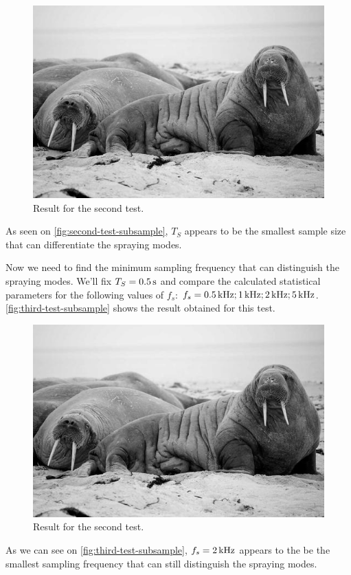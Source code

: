 \documentclass[oneside,12pt]{article}
\begin{document}
\begin{figure}[h!]
    \centering
    \includegraphics[width=.8\textwidth,trim=1 1 1 1,clip]{figures/lorem-picsum.jpg}
    \caption{Result for the second test.}
    \label{fig:second-test-subsample}
\end{figure}

As seen on \autoref{fig:second-test-subsample},  $T_S$ appears to be the smallest sample size that can differentiate the spraying modes.

Now we need to find the minimum sampling frequency that can distinguish the spraying modes. We'll fix $T_S = 0.5 \,\mathrm{s}$ and compare the calculated 
statistical parameters for the following values of $f_s$: $f_s = 0.5 \,\mathrm{kHz}; 1 \,\mathrm{kHz}; 2 \,\mathrm{kHz}; 5 \,\mathrm{kHz}$. \autoref{fig:third-test-subsample}
shows the result obtained for this test.

\begin{figure}[h!]
    \centering
    \includegraphics[width=.8\textwidth,trim=1 1 1 1,clip]{figures/lorem-picsum.jpg}
    \caption{Result for the second test.}
    \label{fig:third-test-subsample}
\end{figure}

As we can see on \autoref{fig:third-test-subsample}, $f_s = 2 \,\mathrm{kHz}$ appears to the be the smallest sampling frequency that can still distinguish the spraying  
modes. 
\end{document}
